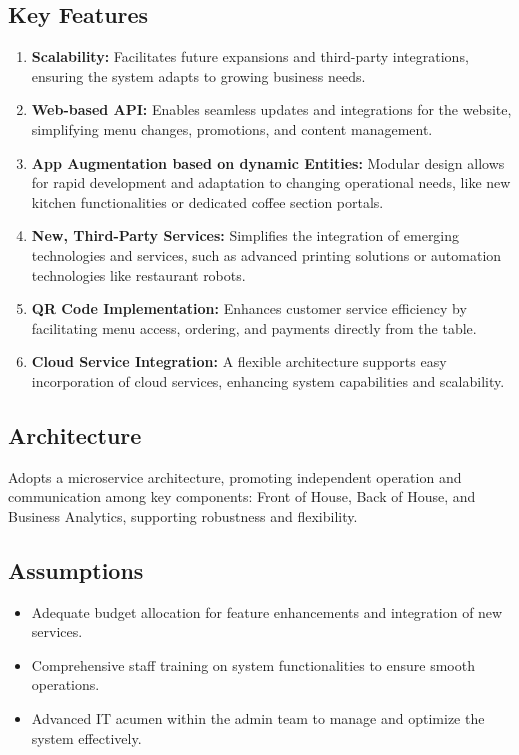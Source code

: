 \documentclass{article}
\begin{document}
\subsection*{Key Features}
\begin{enumerate}[label=\alph*.]
    \item \textbf{Scalability:} Facilitates future expansions and third-party integrations, ensuring the system adapts to growing business needs.
    \item \textbf{Web-based API:} Enables seamless updates and integrations for the website, simplifying menu changes, promotions, and content management.
    \item \textbf{App Augmentation based on dynamic Entities:} Modular design allows for rapid development and adaptation to changing operational needs, like new kitchen functionalities or dedicated coffee section portals.
    \item \textbf{New, Third-Party Services:} Simplifies the integration of emerging technologies and services, such as advanced printing solutions or automation technologies like restaurant robots.
    \item \textbf{QR Code Implementation:} Enhances customer service efficiency by facilitating menu access, ordering, and payments directly from the table.
    \item \textbf{Cloud Service Integration:} A flexible architecture supports easy incorporation of cloud services, enhancing system capabilities and scalability.
\end{enumerate}

\subsection*{Architecture}
Adopts a microservice architecture, promoting independent operation and communication among key components: Front of House, Back of House, and Business Analytics, supporting robustness and flexibility.

\subsection*{Assumptions}
\begin{itemize}
    \item Adequate budget allocation for feature enhancements and integration of new services.
    \item Comprehensive staff training on system functionalities to ensure smooth operations.
    \item Advanced IT acumen within the admin team to manage and optimize the system effectively.
\end{itemize}
\end{document}
